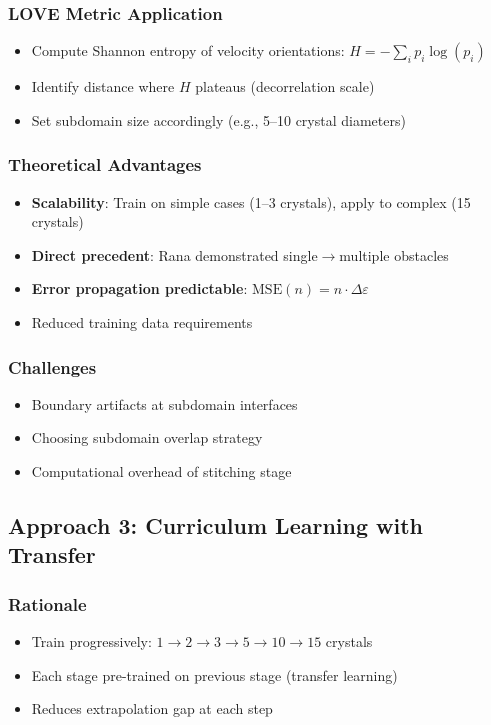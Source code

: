 \subsubsection{LOVE Metric Application}
\begin{itemize}
    \item Compute Shannon entropy of velocity orientations: $H = -\sum_i p_i \log(p_i)$
    \item Identify distance where $H$ plateaus (decorrelation scale)
    \item Set subdomain size accordingly (e.g., 5--10 crystal diameters)
\end{itemize}

\subsubsection{Theoretical Advantages}
\begin{itemize}
    \item \textbf{Scalability}: Train on simple cases (1--3 crystals), apply to complex (15 crystals)
    \item \textbf{Direct precedent}: Rana demonstrated single$\rightarrow$multiple obstacles
    \item \textbf{Error propagation predictable}: $\text{MSE}(n) = n \cdot \Delta\varepsilon$
    \item Reduced training data requirements
\end{itemize}

\subsubsection{Challenges}
\begin{itemize}
    \item Boundary artifacts at subdomain interfaces
    \item Choosing subdomain overlap strategy
    \item Computational overhead of stitching stage
\end{itemize}

\subsection{Approach 3: Curriculum Learning with Transfer}

\subsubsection{Rationale}
\begin{itemize}
    \item Train progressively: $1 \rightarrow 2 \rightarrow 3 \rightarrow 5 \rightarrow 10 \rightarrow 15$ crystals
    \item Each stage pre-trained on previous stage (transfer learning)
    \item Reduces extrapolation gap at each step
\end{itemize}

